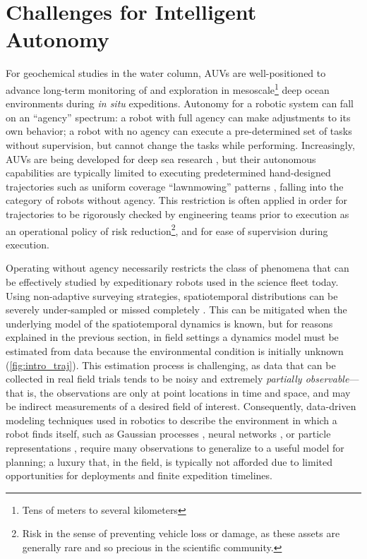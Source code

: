 \section{Challenges for Intelligent Autonomy}
For geochemical studies in the water column, AUVs are well-positioned to advance long-term monitoring of and exploration in mesoscale\footnote{Tens of meters to several kilometers} deep ocean environments during \emph{in situ} expeditions.
Autonomy for a robotic system can fall on an ``agency'' spectrum: a robot with full agency can make adjustments to its own behavior; a robot with no agency can execute a pre-determined set of tasks without supervision, but cannot change the tasks while performing.
Increasingly, AUVs are being developed for deep sea research \autocite{kaiser2016design,yuh2000design,okamoto2019visual,maki2014auv}, but their autonomous capabilities are typically limited to executing predetermined hand-designed trajectories such as uniform coverage ``lawnmowing'' patterns \autocite{camilli2010tracking}, falling into the category of robots without agency.
This restriction is often applied in order for trajectories to be rigorously checked by engineering teams prior to execution as an operational policy of risk reduction\footnote{Risk in the sense of preventing vehicle loss or damage, as these assets are generally rare and so precious in the scientific community.}, and for ease of supervision during execution.

Operating without agency necessarily restricts the class of phenomena that can be effectively studied by expeditionary robots used in the science fleet today.
Using non-adaptive surveying strategies, spatiotemporal distributions can be severely under-sampled or missed completely \autocite{flaspohler2019information, preston2019adaptive}.
This can be mitigated when the underlying model of the spatiotemporal dynamics is known, but for reasons explained in the previous section, in field settings a dynamics model must be estimated from data because the environmental condition is initially unknown (\cref{fig:intro_traj}).
This estimation process is challenging, as data that can be collected in real field trials tends to be noisy and extremely \emph{partially observable}---that is, the observations are only at point locations in time and space, and may be indirect measurements of a desired field of interest. 
Consequently, data-driven modeling techniques used in robotics to describe the environment in which a robot finds itself, such as Gaussian processes \autocite{Rasmussen2004}, neural networks \autocite{cohn1994neural,wang2017predrnn}, or particle representations \autocite{Silver2010}, require many observations to generalize to a useful model for planning; a luxury that, in the field, is typically not afforded due to limited opportunities for deployments and finite expedition timelines.



